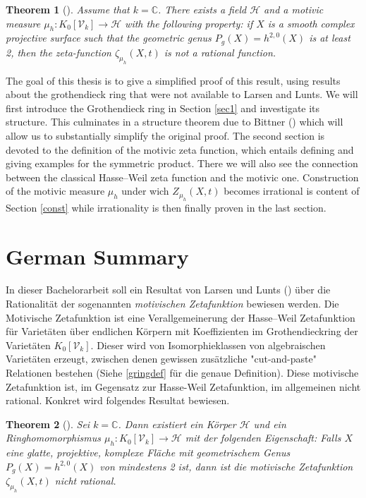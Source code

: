 \documentclass[11pt, a4paper, german]{article}
\theoremstyle{plain}
\newtheorem{theorem}{Theorem}[section]
\theoremstyle{definition}
\newcommand{\gring}[1][k]{K_0[\mathcal{V}_#1]}
\begin{document}
\begin{theorem}[{\cite[Thm. 1.6]{MR1996804}}]
\label{irrational}
Assume that $k = \mathbb{C}$. There exists a field $\mathcal{H}$ and a motivic measure $\mu_h \colon \gring \to \mathcal{H}$ with the following
property: if $X$ is a smooth complex projective surface such that the geometric genus $P_g(X)=h^{2,0}(X)$ is at least 2, 
then the zeta-function $\zeta_{\mu_h}(X,t)$ is not a rational function.
\end{theorem}

The goal of this thesis is to give a simplified proof of this result, using results about the grothendieck ring that were not available
to Larsen and Lunts.
We will first introduce the Grothendieck ring in Section \ref{sec1} and investigate its structure. 
This culminates in a structure theorem due to Bittner (\cite[Thm 3.1]{Bittner}) which will allow us to substantially simplify the original 
proof.
The second section is devoted to the definition of the motivic zeta function, which entails defining and giving examples for the symmetric 
product. There we will also see the connection between the classical Hasse--Weil zeta function and the motivic one.
Construction of the motivic measure $\mu_h$ under wich $Z_{\mu_h}(X,t)$ becomes irrational is content of Section \ref{const} while irrationality
is then finally proven in the last section.

\section{German Summary}
In dieser Bachelorarbeit soll ein Resultat von Larsen und Lunts (\cite{MR1996804}) über die Rationalität der sogenannten 
\emph{motivischen Zetafunktion}
bewiesen werden. Die Motivische Zetafunktion ist eine Verallgemeinerung der Hasse--Weil Zetafunktion für Varietäten über endlichen Körpern
mit Koeffizienten im Grothendieckring der Varietäten $\gring[k]$. Dieser wird von Isomorphieklassen von algebraischen Varietäten erzeugt, 
zwischen denen gewissen zusätzliche "cut-and-paste" Relationen bestehen (Siehe \ref{gringdef} für die genaue Definition). 
Diese motivische Zetafunktion ist, im Gegensatz zur Hasse-Weil Zetafunktion, im allgemeinen nicht rational. 
Konkret wird folgendes Resultat bewiesen.
\begin{theorem}[{\cite[Thm. 1.6]{MR1996804}}]
Sei $k = \mathbb{C}$. Dann existiert ein Körper $\mathcal{H}$ und ein Ringhomomorphismus $\mu_h \colon \gring \to \mathcal{H}$ mit der folgenden
Eigenschaft: Falls $X$ eine glatte, projektive, komplexe Fläche mit geometrischem Genus $P_g(X) = h^{2,0}(X)$ von mindestens 2 ist, dann ist die
motivische Zetafunktion $\zeta_{\mu_h}(X,t)$ nicht rational.
\end{theorem}
\end{document}
